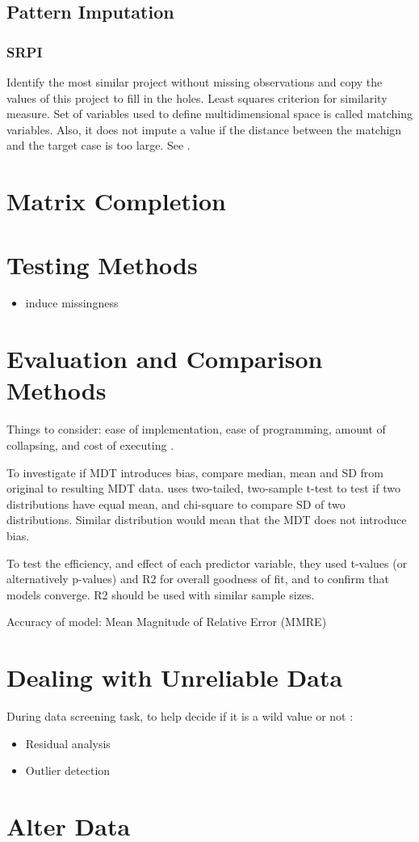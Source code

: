 \documentclass{article}
\begin{document}
\subsection{Pattern Imputation}
\subsubsection{SRPI}
Identify the most similar project without missing observations and copy the values of this project to fill in the holes. Least squares criterion for similarity measure. Set of variables used to define multidimensional space is called matching variables. Also, it does not impute a value if the distance between the matchign and the target case is too large. See \cite{myrt}.


\section{Matrix Completion}

\section{Testing Methods}

\begin{itemize}
	\item induce missingness
\end{itemize}

\section{Evaluation and Comparison Methods}
Things to consider: ease of implementation, ease of programming, amount of collapsing, and cost of executing \cite{poni}.

To investigate if MDT introduces bias, compare median, mean and SD from original to resulting MDT data. \cite{myrt} uses two-tailed, two-sample t-test to test if two distributions have equal mean, and 
chi-square to compare SD of two distributions. Similar distribution would mean that the MDT does not introduce bias.

To test the efficiency, and effect of each predictor variable, they used t-values (or alternatively p-values) and R2 for overall goodness of fit, and to confirm that models converge. R2 should be used with similar sample sizes.

Accuracy of model: Mean Magnitude of Relative Error (MMRE) 

\section*{Dealing with Unreliable Data}
During data screening task, to help decide if it is a wild value or not \cite{myrt}:
\begin{itemize}
	\item Residual analysis
	\item Outlier detection
\end{itemize}
\section{Alter Data}


\end{document}
